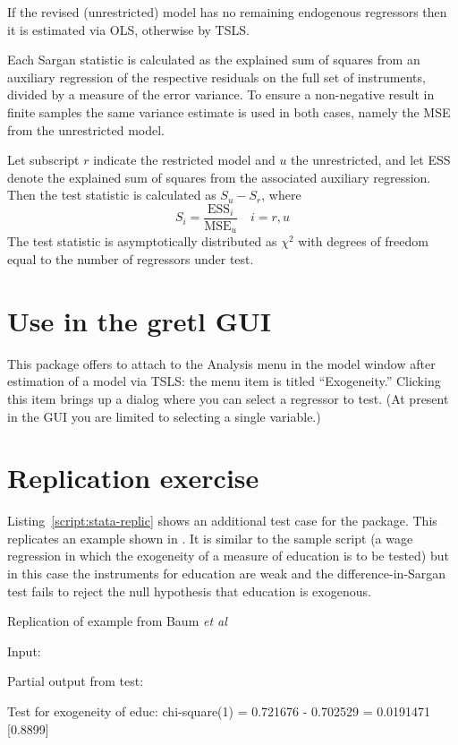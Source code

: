 \documentclass{article}
\begin{document}
If the revised (unrestricted) model has no remaining endogenous
regressors then it is estimated via OLS, otherwise by TSLS.

Each Sargan statistic is calculated as the explained sum of squares
from an auxiliary regression of the respective residuals on the full
set of instruments, divided by a measure of the error variance. To
ensure a non-negative result in finite samples the same variance
estimate is used in both cases, namely the MSE from the unrestricted
model.

Let subscript $r$ indicate the restricted model and $u$ the
unrestricted, and let ESS denote the explained sum of squares from the
associated auxiliary regression. Then the test statistic is calculated
as $S_u - S_r$, where
\[
  S_i = \frac{\mbox{ESS}_i}{\mbox{MSE}_u} \quad i=r,u
\]
The test statistic is asymptotically distributed as $\chi^2$ with
degrees of freedom equal to the number of regressors under test.

\section{Use in the gretl GUI}

This package offers to attach to the \textsf{Analysis} menu in the
model window after estimation of a model via TSLS: the menu item is
titled ``Exogeneity.'' Clicking this item brings up a dialog where you
can select a regressor to test. (At present in the GUI you are limited
to selecting a single variable.)

\section{Replication exercise}

Listing~\ref{script:stata-replic} shows an additional test case for the
package. This replicates an example shown in
\citet[][section 5]{baum07}. It is similar to the sample script (a wage
regression in which the exogeneity of a measure of education is to be
tested) but in this case the instruments for education are weak and
the difference-in-Sargan test fails to reject the null hypothesis that
education is exogenous.

\begin{script}[htbp]
  \caption{Replication of example from Baum \textit{et al}}
  \label{script:stata-replic}
Input:
Partial output from test:
\begin{scodebit}
Test for exogeneity of educ:
 chi-square(1) = 0.721676 - 0.702529 = 0.0191471 [0.8899]
\end{scodebit}
\end{script}





\end{document}
